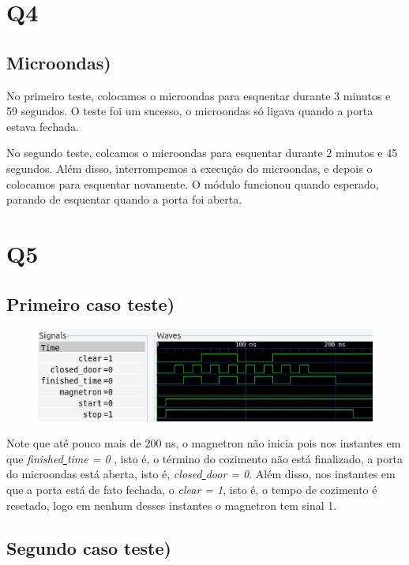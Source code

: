 \documentclass[12pt]{article}
\begin{document}
\section*{Q4}

\subsection*{Microondas)} No primeiro teste, colocamos o microondas para esquentar durante 3 minutos e 59 segundos. O teste foi um sucesso, o microondas só ligava quando a porta estava fechada.

No segundo teste, colcamos o microondas para esquentar durante 2 minutos e 45 segundos. Além disso, interrompemos a execução do microondas, e depois o colocamos para esquentar novamente. O módulo funcionou quando esperado, parando de esquentar quando a porta foi aberta.

\section*{Q5}
\subsection*{Primeiro caso teste)} 

\begin{figure}[!htb]
    \centering
    \includegraphics[scale=0.7]{imgs/testecontrol1}\\
    \label{fig:teste1}
\end{figure}

Note que até pouco mais de 200 ns, o magnetron não inicia pois nos instantes em que \textit{finished\underline{ }time = 0} , isto é, o término do cozimento não está finalizado, a porta do microondas está aberta, isto é, \textit{closed\underline{ }door = 0}. Além disso, nos instantes em que a porta está de fato fechada, o \textit{clear = 1}, isto é, o tempo de cozimento é resetado, logo em nenhum desses instantes o magnetron tem sinal 1.

\subsection*{Segundo caso teste)} 
\end{document}
